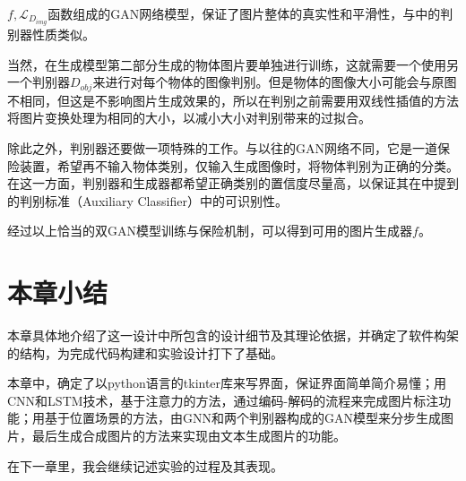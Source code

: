 $f, \mathcal{L}_{D_{img}}$函数组成的GAN网络模型，保证了图片整体的真实性和平滑性，与\cite{isola2017image}中的判别器性质类似。

当然，在生成模型第二部分生成的物体图片要单独进行训练，这就需要一个使用另一个判别器${D_{obj}}$来进行对每个物体的图像判别。但是物体的图像大小可能会与原图不相同，但这是不影响图片生成效果的，所以在判别之前需要用双线性插值的方法将图片变换处理为相同的大小，以减小大小对判别带来的过拟合。 

除此之外，判别器还要做一项特殊的工作。与以往的GAN网络不同，它是一道保险装置，希望再不输入物体类别，仅输入生成图像时，将物体判别为正确的分类。在这一方面，判别器和生成器都希望正确类别的置信度尽量高，以保证其在\cite{odena2017conditional}中提到的判别标准（Auxiliary Classifier）中的可识别性。

经过以上恰当的双GAN模型训练与保险机制，可以得到可用的图片生成器$f$。

\section{本章小结}
本章具体地介绍了这一设计中所包含的设计细节及其理论依据，并确定了软件构架的结构，为完成代码构建和实验设计打下了基础。

本章中，确定了以python语言的tkinter库来写界面，保证界面简单简介易懂；用CNN和LSTM技术，基于注意力的方法，通过编码-解码的流程来完成图片标注功能；用基于位置场景的方法，由GNN和两个判别器构成的GAN模型来分步生成图片，最后生成合成图片的方法来实现由文本生成图片的功能。

在下一章里，我会继续记述实验的过程及其表现。




